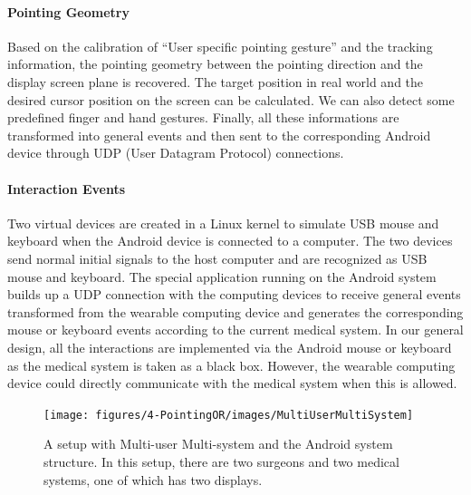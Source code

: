{\paragraph{Pointing Geometry}
Based on the calibration of ``User specific pointing gesture'' and the tracking information,
the pointing geometry between the pointing direction and the display screen plane is recovered. The target position in real world and the desired cursor position on the screen can be calculated. We can also detect some predefined finger and hand gestures. Finally, all these informations are transformed into general events and then sent to the corresponding Android device through UDP (User Datagram Protocol) connections.  

\paragraph{Interaction Events}
Two virtual devices are created in a Linux kernel to simulate USB mouse and keyboard when the Android device is connected to a computer. The two devices send normal initial signals to the host computer and are recognized as USB mouse and keyboard. The special application running on the Android system builds up a UDP connection with the computing devices to receive general events transformed from the wearable computing device and generates the corresponding mouse or keyboard events according to the current medical system. In our general design, all the interactions are implemented via the Android mouse or keyboard as the medical system is taken as a black box. However, the wearable computing device could directly communicate with the medical system when this is allowed. 
\begin{figure}
	\centering
	\texttt{[image: figures/4-PointingOR/images/MultiUserMultiSystem]}
	\caption{A setup with Multi-user Multi-system and the Android system structure. In this setup, there are two surgeons and two medical systems, one of which has two displays. }
	\label{fig:multiUserMultiSystem}       %
\end{figure}

}
